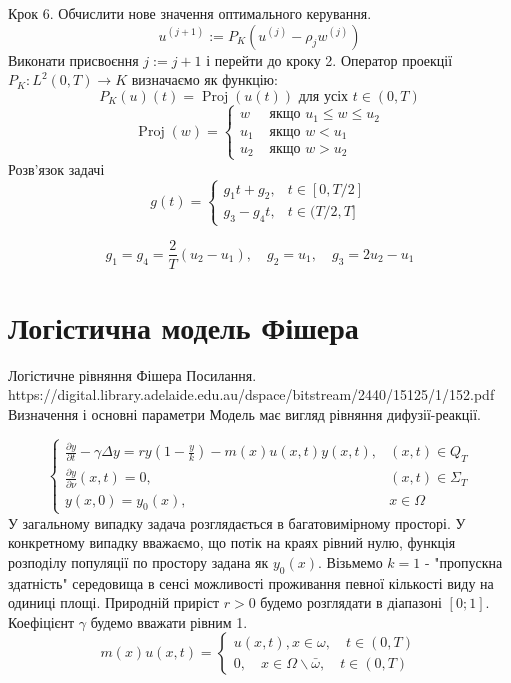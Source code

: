 \documentclass[a4paper,12pt]{extreport}
\begin{document}
Крок 6. Обчислити нове значення оптимального керування.
$$
u^{(j+1)}:=P_K\left(u^{(j)}-\rho_j w^{(j)}\right)
$$
Виконати присвоєння $j:=j+1$ і перейти до кроку 2.
Оператор проекції $P_K: L^2(0, T) \rightarrow K$ визначаємо як функцію:
$$
P_K(u)(t)=\operatorname{Proj}(u(t)) \text { для усіх } t \in(0, T)
$$
$$
\operatorname{Proj}(w)= \begin{cases}w & \text { якщо } u_1 \leq w \leq u_2 \\ u_1 & \text { якщо } w<u_1 \\ u_2 & \text { якщо } w>u_2\end{cases}
$$
Розв'язок задачі
$$
g(t)= \begin{cases}g_1 t+g_2, & t \in[0, T / 2] \\ g_3-g_4 t, & t \in(T / 2, T]\end{cases}
$$

$$
g_1=g_4=\frac{2}{T}\left(u_2-u_1\right), \quad g_2=u_1, \quad g_3=2 u_2-u_1
$$


\section{Логістична модель Фішера}
Логістичне рівняння Фішера
Посилання. https://digital.library.adelaide.edu.au/dspace/bitstream/2440/15125/1/152.pdf
Визначення і основні параметри
Модель має вигляд рівняння дифузії-реакції. 

$$
\begin{cases}\frac{\partial y}{\partial t}-\gamma \Delta y=r y\left(1-\frac{y}{k}\right)-m(x) u(x, t) y(x, t), & (x, t) \in Q_T \\ \frac{\partial y}{\partial \nu}(x, t)=0, & (x, t) \in \Sigma_T \\ y(x, 0)=y_0(x), & x \in \Omega\end{cases}
$$
У загальному випадку задача розглядається в багатовимірному просторі. У конкретному випадку вважаємо, що потік на краях рівний нулю, функція розподілу популяції по простору задана як $y_0(x)$. 
Візьмемо $k=1$ - "пропускна здатність"  середовища в сенсі можливості проживання певної кількості виду на одиниці площі. Природній приріст $r > 0$ будемо розглядати в діапазоні $[0; 1]$. Коефіцієнт $\gamma$ будемо вважати рівним 1.
$$
m(x) u(x, t)=\left\{\begin{array}{l}
u(x, t), x \in \omega, \quad t \in(0, T) \\
0, \quad x \in \Omega \backslash \bar{\omega}, \quad t \in(0, T)
\end{array}\right.
$$
\end{document}

